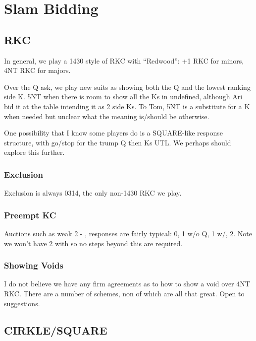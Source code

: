 \documentclass[tom-ari]{subfile}
\begin{document}
\chapter{Slam Bidding}

\section{RKC}

In general, we play a 1430 style of RKC with ``Redwood'':  +1 RKC for minors, 4NT RKC for majors.

Over the Q ask, we play new suits as showing both the Q and the lowest ranking side K.  5NT when there is room to show all the Ks in undefined, although Ari bid it at the table intending it as 2 side Ks.  To Tom, 5NT is a substitute for a K when needed but unclear what the meaning is/should be otherwise.

\begin{noted}
One possibility that I know some players do is a SQUARE-like response structure, with go/stop for the trump Q then Ks UTL. We perhaps should explore this further.
\end{noted}

\subsection{Exclusion}

Exclusion is always 0314, the only non-1430 RKC we play.

\subsection{Preempt KC}

Auctions such as weak 2 - , responses are fairly typical:  0, 1 w/o Q, 1 w/, 2.  Note we won't have 2 with so no steps beyond this are required.

\subsection{Showing Voids}

I do not believe we have any firm agreements as to how to show a void over 4NT RKC.  There are a number of schemes, non of which are all that great.  Open to suggestions.

\section{CIRKLE/SQUARE}
\end{document}
